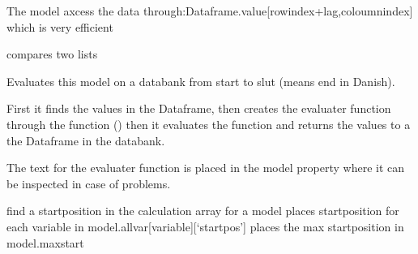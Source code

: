 \documentclass[letterpaper,10pt,english]{sphinxmanual}
\begin{document}
\begin{fulllineitems}
\begin{fulllineitems}
\sphinxAtStartPar
The model axcess the data through:Dataframe.value{[}rowindex+lag,coloumnindex{]} which is very efficient

\end{fulllineitems}


\begin{fulllineitems}
\label{\detokenize{index:modelclass.BaseModel.eqcolumns}}
\pysigstartsignatures
{}
\pysigstopsignatures
\sphinxAtStartPar
compares two lists

\end{fulllineitems}


\begin{fulllineitems}
\label{\detokenize{index:modelclass.BaseModel.xgenr}}
\pysigstartsignatures
{}
\pysigstopsignatures
\sphinxAtStartPar
Evaluates this model on a databank from start to slut (means end in Danish).

\sphinxAtStartPar
First it finds the values in the Dataframe, then creates the evaluater function through the  function
()
then it evaluates the function and returns the values to a the Dataframe in the databank.

\sphinxAtStartPar
The text for the evaluater function is placed in the model property 
where it can be inspected
in case of problems.

\end{fulllineitems}


\begin{fulllineitems}
\label{\detokenize{index:modelclass.BaseModel.findpos}}
\pysigstartsignatures
{}
\pysigstopsignatures
\sphinxAtStartPar
find a startposition in the calculation array for a model
places startposition for each variable in model.allvar{[}variable{]}{[}‘startpos’{]}
places the max startposition in model.maxstart


\end{fulllineitems}
\end{fulllineitems}
\end{document}
